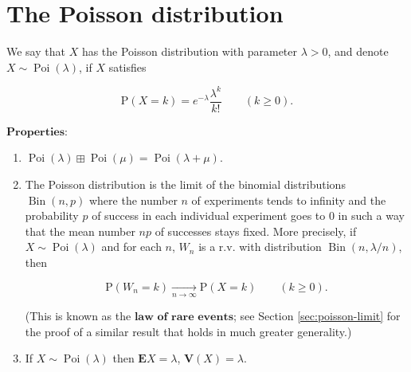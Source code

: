 \section{The Poisson distribution}

We say that $X$ has the Poisson distribution with
parameter $\lambda>0$, and denote
$X\sim \operatorname{Poi}(\lambda)$, if $X$ satisfies

\[
\mathrm{P}(X=k) = e^{-\lambda} \frac{\lambda^k}{k!} \qquad (k\ge 0).
\]

\noindent $\textbf{Properties:}$

\begin{enumerate}[label=\arabic*.]
\item $\operatorname{Poi}(\lambda) \mathop{\boxplus}
\operatorname{Poi}(\mu) =
\operatorname{Poi}(\lambda+\mu)$.

\item The Poisson distribution is the limit of the binomial
distributions $\operatorname{Bin}(n,p)$ where the
number $n$ of experiments tends to infinity and the
probability $p$ of success in each individual
experiment goes to $0$ in such a way that the mean
number $np$ of successes stays fixed. More precisely,
if $X\sim \operatorname{Poi}(\lambda)$ and for each
$n$, $W_n$ is a r.v. with distribution
$\operatorname{Bin}(n,\lambda/n)$, then

\[
\mathrm{P}(W_n = k) \xrightarrow[n\to\infty]{} \mathrm{P}(X=k) \qquad (k\ge 0).
\]

\noindent (This is known as the $\textbf{law of rare events}$;
see Section \ref{sec:poisson-limit} for the proof of a
similar result that holds in much greater generality.)

\item If $X \sim \operatorname{Poi}(\lambda)$ then
$\mathbf{E} X = \lambda$, $\mathbf{V}(X)=\lambda$.
\end{enumerate}
